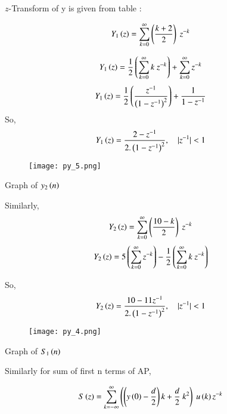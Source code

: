 \documentclass[beamer]{IEEEtran}
\theoremstyle{remark}
\begin{document}
$z$-Transform of y is given from table :

\begin{align}
Y_1\left(z\right)&=\sum_{k=0}^{\infty} \left(\frac{k+2}{2}\right)\ z^{-k}
\end{align}

\begin{align}
    \label{q13}
    Y_1\brak{z}&=\frac{1}{2}\brak{\sum_{k=0}^{\infty}k\ z^{-k}}+\sum_{k=0}^{\infty}z^{-k}
\end{align}
\begin{align}
    \label{q13}
    Y_1\left(z\right)&=\frac{1}{2}\left(\frac{z^{-1}}{\left(1-z^{-1}\right)^2}\right)+\frac{1}{1-z^{-1}}
\end{align}
So,
\begin{align} Y_1\left(z\right)&=\frac{2-z^{-1}}{2.\left(1-z^{-1}\right)^2},\quad |z^{-1}|<1\end{align}

\begin{figure}[h]
    \centering
    \texttt{[image: py\_5.png]}
    \label{fig:x2n}
\end{figure}

\begin{center}
    Graph of $y_2\left(n\right) $
\end{center}

Similarly,
\begin{align}Y_2\left(z\right)&=\sum_{k=0}^{\infty} \left(\frac{10-k}{2}\right)\ z^{-k}\end{align}
\begin{align}Y_2\brak{z}&=5\brak{\sum_{k=0}^{\infty}z^{-k}}-\frac{1}{2}\brak{\sum_{k=0}^{\infty}k\ z^{-k}}\end{align}

So,
\begin{align}Y_2\left(z\right)&=\frac{10-11z^{-1}}{2.\left(1-z^{-1}\right)^2},\quad |z^{-1}|<1 \end{align}

\begin{figure}[h]
    \centering
    \texttt{[image: py\_4.png]}
    \label{fig:s1n}
\end{figure}

\begin{center}
    Graph of $S_1\left(n\right)$
\end{center}

Similarly for sum of first n terms of AP,

\begin{align}
S\brak{z}&=\sum_{k=-\infty}^{\infty}\left(\brak{y\brak{0}-\frac{d}{2}}k+\frac{d}{2}\ k^2\right)\ u\brak{k}z^{-k}
\end{align}
\end{document}
